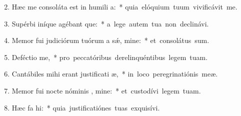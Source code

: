\begin{flushleft}
\begin{enumerate}[leftmargin=*]
\setcounter{enumi}{1}

\item Hæc me consoláta est in humili a:~* \mbox{quia elóquium tuum vivificávit me.}
\item Supérbi iníque agébant que:~* \mbox{a lege autem tua non declinávi.}
\item Memor fui judiciórum tuórum a s\'{\ae}, mine:~* \mbox{et consolátus sum.}
\item Deféctio  me,~* \mbox{pro peccatóribus derelinquéntibus legem tuam.}
\item Cantábiles mihi erant justificati æ,~* \mbox{in loco peregrinatiónis meæ.}
\item Memor fui nocte nóminis , mine:~* \mbox{et custodívi legem tuam.}
\item Hæc fa  hi:~* \mbox{quia justificatiónes tuas exquisívi.}


\end{enumerate}
\end{flushleft}


